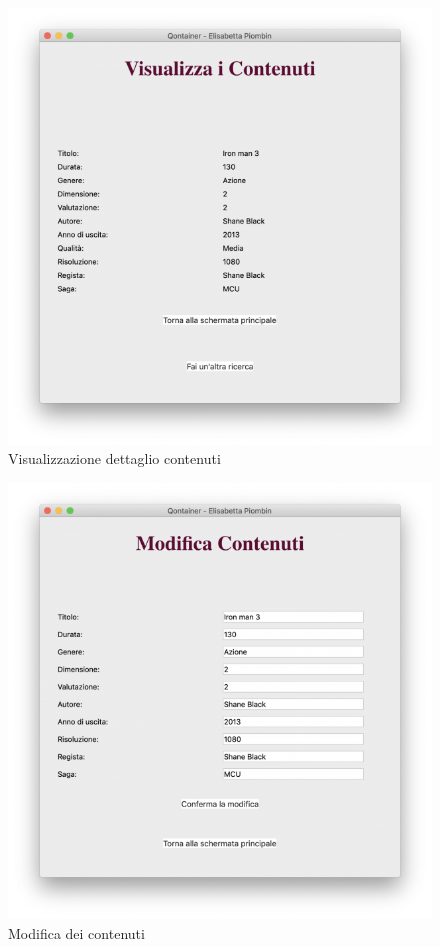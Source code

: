\documentclass[a4paper,10pt]{article}
\begin{document}
\begin{figure}[H]
	\begin{center}
		\includegraphics[width=\textwidth,keepaspectratio]{immagini/VisualizzaContenuti.png}
	\end{center}
	\caption{\label{fig:my-label} Visualizzazione dettaglio contenuti}
\end{figure}

\begin{figure}[H]
	\begin{center}
		\includegraphics[width=\textwidth,keepaspectratio]{immagini/ModificaContenuti.png}
	\end{center}
	\caption{\label{fig:my-label} Modifica dei contenuti}
\end{figure}
\end{document}
